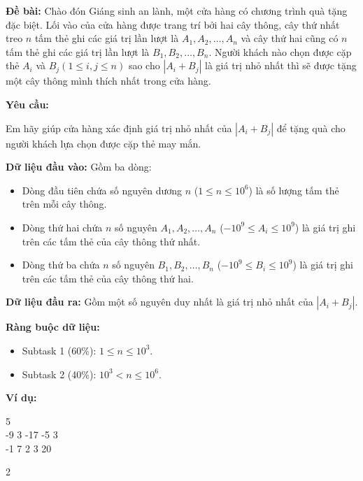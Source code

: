 \documentclass[12pt]{scrartcl}  %
\begin{document}
\textbf{Đề bài:}
Chào đón Giáng sinh an lành, một cửa hàng có chương trình quà tặng đặc biệt. Lối vào của cửa hàng được trang trí bởi hai cây thông, cây thứ nhất treo $n$ tấm thẻ ghi các giá trị lần lượt là $A_1, A_2, \ldots, A_n$ và cây thứ hai cũng có $n$ tấm thẻ ghi các giá trị lần lượt là $B_1, B_2, \ldots, B_n$. Người khách nào chọn được cặp thẻ $A_i$ và $B_j (1 \leq i,j \leq n)$ sao cho $|A_i + B_j|$ là giá trị nhỏ nhất thì sẽ được tặng một cây thông mình thích nhất trong cửa hàng. 

\textbf{Yêu cầu:}

Em hãy giúp cửa hàng xác định giá trị nhỏ nhất của $|A_i + B_j|$ để tặng quà cho người khách lựa chọn được cặp thẻ may mắn.

\textbf{Dữ liệu đầu vào:}
Gồm ba dòng:
\begin{itemize}
    \item Dòng đầu tiên chứa số nguyên dương $n$ ($1 \leq n \leq 10^6$) là số lượng tấm thẻ trên mỗi cây thông.
    \item Dòng thứ hai chứa $n$ số nguyên $A_1, A_2, \ldots, A_n$ ($-10^9 \leq A_i \leq 10^9$) là giá trị ghi trên các tấm thẻ của cây thông thứ nhất.
    \item Dòng thứ ba chứa $n$ số nguyên $B_1, B_2, \ldots, B_n$ ($-10^9 \leq B_i \leq 10^9$) là giá trị ghi trên các tấm thẻ của cây thông thứ hai.
\end{itemize}

\textbf{Dữ liệu đầu ra:}
Gồm một số nguyên duy nhất là giá trị nhỏ nhất của $|A_i + B_j|$.

\textbf{Ràng buộc dữ liệu:}
\begin{itemize}
    \item Subtask 1 (60\%): $1 \leq n \leq 10^3$.
    \item Subtask 2 (40\%): $10^3 < n \leq 10^6$.
\end{itemize}

\textbf{Ví dụ:}
\begin{tcolorbox}[colback=gray!5!white, colframe=blue!50!black, title=Input]
5\\
-9 3 -17 -5 3\\
-1 7 2 3 20
\end{tcolorbox}
\begin{tcolorbox}[colback=gray!5!white, colframe=green!50!black, title=Output]
2
\end{tcolorbox}
\end{document}
